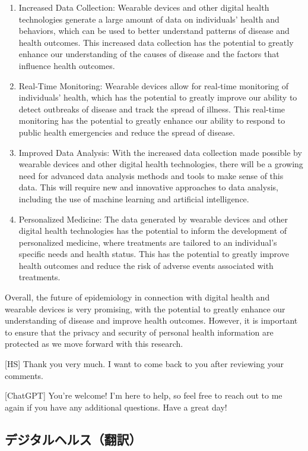 \documentclass[
]{book}
\providecommand{\tightlist}{%
  \setlength{\itemsep}{0pt}\setlength{\parskip}{0pt}}
\theoremstyle{definition}
\theoremstyle{definition}
\theoremstyle{definition}
\theoremstyle{definition}
\theoremstyle{remark}
\begin{document}
\begin{enumerate}
\def\labelenumi{\arabic{enumi}.}
\tightlist
\item
  Increased Data Collection: Wearable devices and other digital health technologies generate a large amount of data on individuals' health and behaviors, which can be used to better understand patterns of disease and health outcomes. This increased data collection has the potential to greatly enhance our understanding of the causes of disease and the factors that influence health outcomes.
\item
  Real-Time Monitoring: Wearable devices allow for real-time monitoring of individuals' health, which has the potential to greatly improve our ability to detect outbreaks of disease and track the spread of illness. This real-time monitoring has the potential to greatly enhance our ability to respond to public health emergencies and reduce the spread of disease.
\item
  Improved Data Analysis: With the increased data collection made possible by wearable devices and other digital health technologies, there will be a growing need for advanced data analysis methods and tools to make sense of this data. This will require new and innovative approaches to data analysis, including the use of machine learning and artificial intelligence.
\item
  Personalized Medicine: The data generated by wearable devices and other digital health technologies has the potential to inform the development of personalized medicine, where treatments are tailored to an individual's specific needs and health status. This has the potential to greatly improve health outcomes and reduce the risk of adverse events associated with treatments.
\end{enumerate}

Overall, the future of epidemiology in connection with digital health and wearable devices is very promising, with the potential to greatly enhance our understanding of disease and improve health outcomes. However, it is important to ensure that the privacy and security of personal health information are protected as we move forward with this research.

{[}HS{]} Thank you very much. I want to come back to you after reviewing your comments.

{[}ChatGPT{]} You're welcome! I'm here to help, so feel free to reach out to me again if you have any additional questions. Have a great day!

\hypertarget{digitalhealthj}{%
\subsection{デジタルヘルス（翻訳）}\label{digitalhealthj}}
\end{document}
